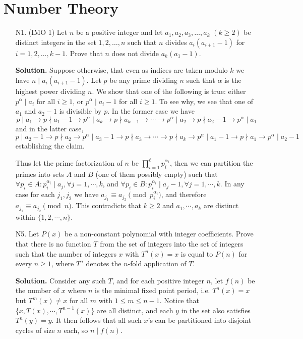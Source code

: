 \documentclass[11pt,a4paper]{article}
\begin{document}
    \section*{Number Theory}
    \begin{enumerate}
    	\item [N1.] (IMO 1)
    	Let $ n$ be a positive integer and let $ a_1,a_2,a_3,\ldots,a_k$ $ ( k\ge 2)$ be distinct integers in the set $ { 1,2,\ldots,n}$ such that $ n$ divides $ a_i(a_{i + 1} - 1)$ for $ i = 1,2,\ldots,k - 1$. Prove that $ n$ does not divide $ a_k(a_1 - 1).$
    	
    	\textbf{Solution.} 
    	Suppose otherwise, that even as indices are taken modulo $k$ we have $n\mid a_i(a_{i + 1} - 1)$. 
    	Let $p$ be any prime dividing $n$ such that $\alpha$ is the highest power dividing $n$. 
    	We show that one of the following is true: 
    	either $p^{\alpha}\mid a_i$ for all $i\ge 1$, or $p^{\alpha}\mid a_i - 1$ for all $i\ge 1$. 
    	To see why, we see that one of $a_1$ and $a_2 - 1$ is divisible by $p$. 
    	In the former case we have 
    	\[
    	p\mid a_1\to p\nmid a_1-1 \to p^{\alpha}\mid a_k\to p\nmid a_{k-1}\to\cdots\to p^{\alpha}\mid a_2 \to p\nmid a_2 - 1\to p^{\alpha}\mid a_1
    	\]
    	and in the latter case, 
    	\[
    	p\mid a_2 - 1\to p\nmid a_2\to p^{\alpha}\mid a_3 - 1\to p\nmid a_3\to \cdots\to p\nmid a_k\to p^{\alpha}\mid a_1 - 1\to p\nmid a_1\to p^{\alpha}\mid a_2-1
    	\]
    	establishing the claim. 
    	
    	Thus let the prime factorization of $n$ be $\prod_{i=1}^{\ell} p_i^{\alpha_i}$, 
    	then we can partition the primes into sets $A$ and $B$ (one of them possibly empty) such that 
    	$\forall p_i\in A: p_i^{\alpha_i}\mid a_j,\forall j=1, \cdots, k$, and 
    	$\forall p_i\in B: p_i^{\alpha_i}\mid a_j - 1,\forall j=1, \cdots, k$. 
    	In any case for each $j_1, j_2$ we have $a_{j_1}\equiv a_{j_2}\pmod{p_i^{\alpha_i}}$, 
    	and therefore $a_{j_1}\equiv a_{j_2}\pmod{n}$. 
    	This contradicts that $k\ge 2$ and $a_1, \cdots, a_k$ are distinct within $\{1, 2, \cdots, n\}$. 
    	
    	\item [N5.]
    	Let $P(x)$ be a non-constant polynomial with integer coefficients. Prove that there is no function $T$ from the set of integers into the set of integers such that the number of integers $x$ with $T^n(x)=x$ is equal to $P(n)$ for every $n\geq 1$, where $T^n$ denotes the $n$-fold application of $T$.
    	
    	\textbf{Solution.} 
    	Consider any such $T$, 
    	and for each positive integer $n$, let $f(n)$ be the number of $x$ where $n$ is the minimal fixed point period, 
    	i.e. $T^n(x)=x$ but $T^m(x)\neq x$ for all $m$ with $1\le m \le n - 1$. 
    	Notice that $\{x, T(x), \cdots, T^{n-1}(x)\}$ are all distinct, and each $y$ in the set also satisfies $T^n(y)=y$. 
    	It then follows that all such $x$'s can be partitioned into disjoint cycles of size $n$ each, so $n\mid f(n)$. 
    	

\end{enumerate}
\end{document}
